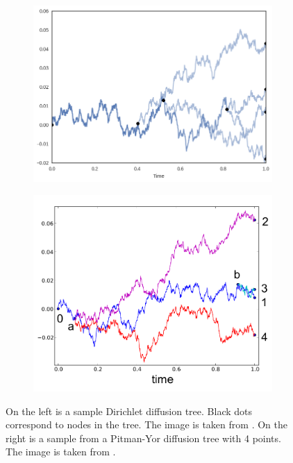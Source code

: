 \begin{figure}[H]
    \centering
    \begin{subfigure}[b]{0.45\textwidth}
        \centering
        \includegraphics[width=\textwidth]{img/trees/ddt}
    \end{subfigure}
    \hfill
    \begin{subfigure}[b]{0.45\textwidth}
        \centering
        \includegraphics[width=\textwidth]{img/trees/pydt}
    \end{subfigure}
    \caption{
      On the left is a sample Dirichlet diffusion tree.
      Black dots correspond to nodes in the tree. The image is taken from \citet{Vikram2016}.
      On the right is a sample from a Pitman-Yor diffusion tree with 4 points.
      The image is taken from \citet{Knowles2015}.
    }
    \label{fig:ddt-vis}
\end{figure}

